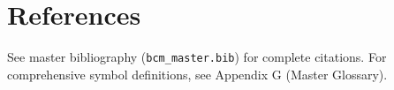 \section{References}
\label{sec:ctm-references}

\nocite{bcm_master}
See master bibliography (\texttt{bcm\_master.bib}) for complete citations.
For comprehensive symbol definitions, see Appendix G (Master Glossary).

